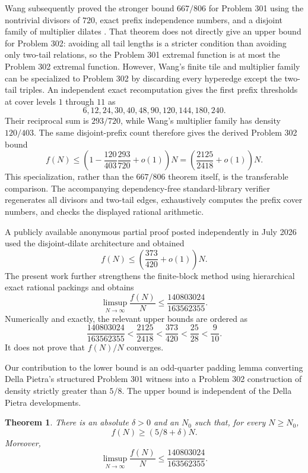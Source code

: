 \documentclass[11pt]{article}
\newtheorem{theorem}{Theorem}
\theoremstyle{definition}
\theoremstyle{plain}
\begin{document}
Wang subsequently proved the stronger bound $667/806$ for Problem 301 using
the nontrivial divisors of $720$, exact prefix independence numbers, and a
disjoint family of multiplier dilates \cite{Wang301_2026}.  That theorem does
not directly give an upper bound for Problem 302: avoiding all tail lengths is
a stricter condition than avoiding only two-tail relations, so the Problem
301 extremal function is at most the Problem 302 extremal function.  However,
Wang's finite tile and multiplier family can be specialized to Problem 302 by
discarding every hyperedge except the two-tail triples.  An independent exact
recomputation gives the first prefix thresholds at cover levels $1$ through
$11$ as
\[
 6,12,24,30,40,48,90,120,144,180,240.
\]
Their reciprocal sum is $293/720$, while Wang's multiplier family has density
$120/403$.  The same disjoint-prefix count therefore gives the derived
Problem 302 bound
\[
 f(N)\leq\left(1-\frac{120}{403}\frac{293}{720}+o(1)\right)N
      =\left(\frac{2125}{2418}+o(1)\right)N.
\]
This specialization, rather than the $667/806$ theorem itself, is the
transferable comparison.  The accompanying dependency-free standard-library
verifier regenerates all divisors and two-tail edges, exhaustively computes
the prefix cover numbers, and checks the displayed rational arithmetic.

A publicly available anonymous partial proof posted independently in July 2026
\cite{Partial302Pastebin2026} used the disjoint-dilate architecture and obtained
\[
 f(N)\leq\left(\frac{373}{420}+o(1)\right)N.
\]
The present work further strengthens the finite-block method using
hierarchical exact rational packings and obtains
\[
 \limsup_{N\to\infty}\frac{f(N)}N
 \leq\frac{140803024}{163562355}.
\]
Numerically and exactly, the relevant upper bounds are ordered as
\[
 \frac{140803024}{163562355}<\frac{2125}{2418}
 <\frac{373}{420}<\frac{25}{28}<\frac9{10}.
\]
It does not prove that $f(N)/N$ converges.

Our contribution to the lower bound is an odd-quarter padding lemma converting
Della Pietra's structured Problem 301 witness into a Problem 302 construction
of density strictly greater than $5/8$.  The upper bound is independent of the
Della Pietra developments.

\begin{theorem}\label{thm:main}
There is an absolute $\delta>0$ and an $N_0$ such that, for every $N\geq N_0$,
\[
 f(N)\geq(5/8+\delta)N.
\]
Moreover,
\[
 \limsup_{N\to\infty}\frac{f(N)}N
 \leq\frac{140803024}{163562355}.
\]
\end{theorem}
\end{document}
